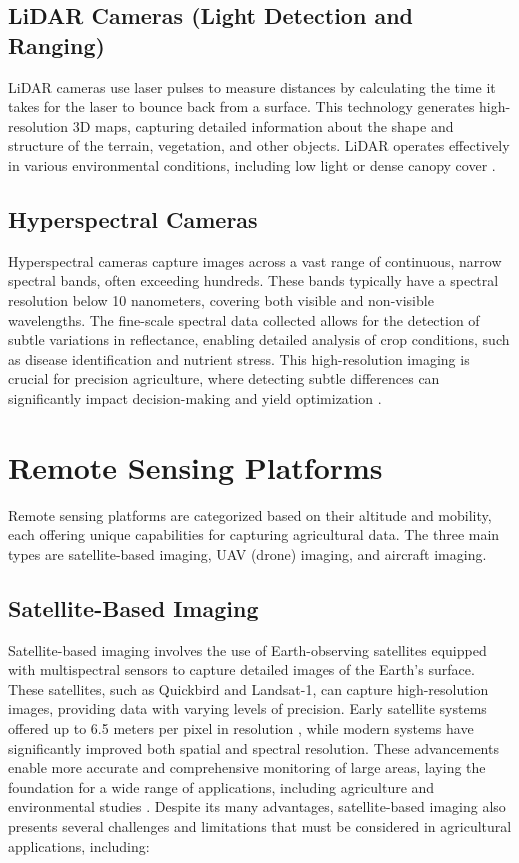 \subsection{LiDAR Cameras (Light Detection and Ranging)}

LiDAR cameras use laser pulses to measure distances by calculating the time it takes for the laser to bounce back from a surface. This technology generates high-resolution 3D maps, capturing detailed information about the shape and structure of the terrain, vegetation, and other objects. LiDAR operates effectively in various environmental conditions, including low light or dense canopy cover \parencite{delavarpour2021technical}.

\subsection{Hyperspectral Cameras}
Hyperspectral cameras capture images across a vast range of continuous, narrow spectral bands, often exceeding hundreds. These bands typically have a spectral resolution below 10 nanometers, covering both visible and non-visible wavelengths. The fine-scale spectral data collected allows for the detection of subtle variations in reflectance, enabling detailed analysis of crop conditions, such as disease identification and nutrient stress. This high-resolution imaging is crucial for precision agriculture, where detecting subtle differences can significantly impact decision-making and yield optimization \parencite{delavarpour2021technical} \parencite{lu2020recent}.

\section{Remote Sensing Platforms}
Remote sensing platforms are categorized based on their altitude and mobility, each offering unique capabilities for capturing agricultural data. The three main types are satellite-based imaging, UAV (drone) imaging, and aircraft imaging.

\subsection{Satellite-Based Imaging}
Satellite-based imaging involves the use of Earth-observing satellites equipped with multispectral sensors to capture detailed images of the Earth's surface. These satellites, such as Quickbird and Landsat-1, can capture high-resolution images, providing data with varying levels of precision. Early satellite systems offered up to 6.5 meters per pixel in resolution \parencite{phang2023satellite}, while modern systems have significantly improved both spatial and spectral resolution. These advancements enable more accurate and comprehensive monitoring of large areas, laying the foundation for a wide range of applications, including agriculture and environmental studies \parencite{adao2017hyperspectral}. Despite its many advantages, satellite-based imaging also presents several challenges and limitations that must be considered in agricultural applications, including:

